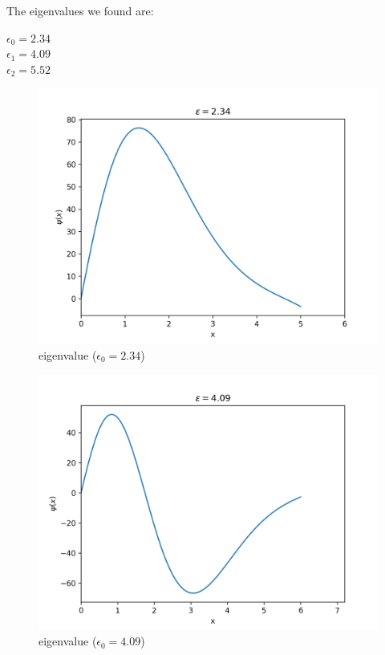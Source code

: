 \documentclass[11pt, a4paper, reqno]{scrartcl}
\begin{document}
    	\begin{figure}[H]
        	        
    	\end{figure}
    	
    	The eigenvalues we found are: 
    	\begin{center}
    		$\epsilon_0 = 2.34$ \\
    		$\epsilon_1 = 4.09$ \\
    		$\epsilon_2 = 5.52$ \\
    	\end{center}
    	
    	\begin{figure}[H]
    			\includegraphics[width=.3\paperwidth]{plot_2_34.png}
    			\caption{eigenvalue ($\epsilon_0 = 2.34$)}
    	\end{figure}
    	\begin{figure}[H]
    			\includegraphics[width=.3\paperwidth]{plot_4_09.png}
    			\caption{eigenvalue ($\epsilon_0 = 4.09$)}
    	\end{figure}
\end{document}
